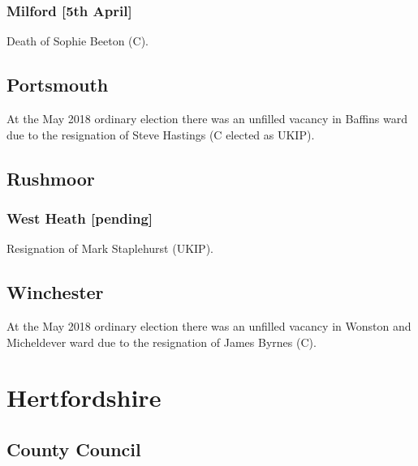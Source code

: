 \documentclass[a4paper,openany]{book}
\begin{document}
\begin{resultsiii}
\subsubsection*{Milford \hspace*{\fill}\nolinebreak[1]%
\enspace\hspace*{\fill}
[5th April]}


Death of Sophie Beeton (C).

\subsection*{Portsmouth}

At the May 2018 ordinary election there was an unfilled vacancy in Baffins ward due to the resignation of Steve Hastings (C elected as UKIP).

\subsection*{Rushmoor}

\subsubsection*{West Heath \hspace*{\fill}\nolinebreak[1]%
\enspace\hspace*{\fill}
[pending]}


Resignation of Mark Staplehurst (UKIP).

\subsection*{Winchester}

At the May 2018 ordinary election there was an unfilled vacancy in Wonston and Micheldever ward due to the resignation of James Byrnes (C).

\section{Hertfordshire}

\subsection*{County Council}


\end{resultsiii}
\end{document}

